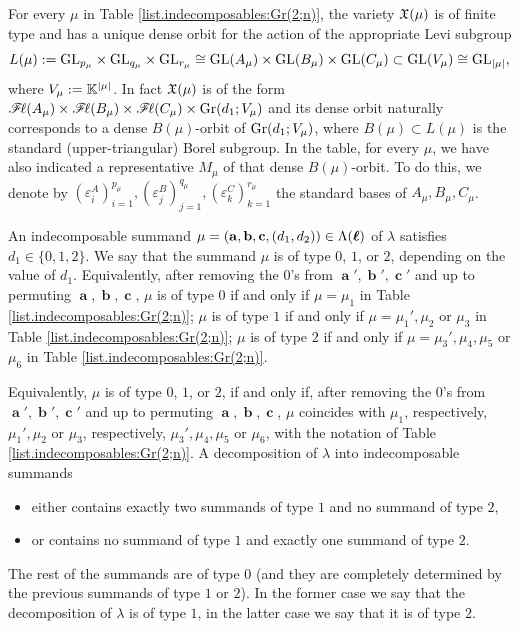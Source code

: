\documentclass[12pt,reqno]{amsart}
\begin{document}
For every $\mu$ in Table \ref{list.indecomposables:Gr(2;n)}, the variety $\mathfrak{X}(\mu)$ is of finite type and has a unique dense orbit for the action of the appropriate Levi subgroup
$$L(\mu):=\mathrm{GL}_{p_\mu}\times \mathrm{GL}_{q_\mu}\times \mathrm{GL}_{r_\mu}\cong \mathrm{GL}(A_\mu)\times\mathrm{GL}(B_\mu)\times\mathrm{GL}(C_\mu)\subset \mathrm{GL}(V_\mu)\cong\mathrm{GL}_{|\mu|},$$
where $V_\mu:=\mathbb{K}^{|\mu|}$. %
In fact $\mathfrak{X}(\mu)$ is of the form
$\mathscr{F}\!\ell(A_\mu)\times\mathscr{F}\!\ell(B_\mu)\times\mathscr{F}\!\ell(C_\mu)\times\mathrm{Gr}(d_1;V_\mu)$
and its dense orbit naturally corresponds to a dense $B(\mu)$-orbit of $\mathrm{Gr}(d_1;V_\mu)$, where $B(\mu)\subset L(\mu)$ is the standard (upper-triangular) Borel subgroup. In the table, for every $\mu$, we have also indicated a representative $M_\mu$ of that dense $B(\mu)$-orbit. To do this, we denote by $(\varepsilon_i^A)_{i=1}^{p_\mu}, (\varepsilon_j^B)_{j=1}^{q_\mu},(\varepsilon_k^C)_{k=1}^{r_\mu}$ the standard bases of $A_\mu,B_\mu,C_\mu$.

An indecomposable summand $\mu=(\mathbf{a},\mathbf{b},\mathbf{c},(d_1,d_2))\in\Lambda(\boldsymbol{\ell})$ of $\lambda$
satisfies $d_1\in\{0,1,2\}$. We say that the summand $\mu$ is of type $0$, $1$, or $2$, depending on the value of $d_1$.
Equivalently, after removing the $0$'s from $\mbfa',\mbfb',\mbfc'$ and up to permuting $\mbfa,\mbfb,\mbfc$,
$\mu$ is of type $0$ if and only if $ \mu = \mu_1 $ in Table \ref{list.indecomposables:Gr(2;n)};
$\mu$ is of type $1$ if and only if $ \mu = \mu_1',\mu_2$ or $\mu_3$ in Table \ref{list.indecomposables:Gr(2;n)};
$\mu$ is of type $2$ if and only if $ \mu = \mu_3',\mu_4,\mu_5$ or $\mu_6$ in Table \ref{list.indecomposables:Gr(2;n)}.

Equivalently, $\mu$ is of type $0$, $1$, or $2$, if and only if, after removing the $0$'s from $\mbfa',\mbfb',\mbfc'$ and up to permuting $\mbfa,\mbfb,\mbfc$, $\mu$ coincides with $\mu_1$, respectively, $\mu_1',\mu_2$ or $\mu_3$, respectively, $\mu_3',\mu_4,\mu_5$ or $\mu_6$, with the notation of Table \ref{list.indecomposables:Gr(2;n)}.
A decomposition of $\lambda$ into indecomposable summands
\begin{itemize}
    \item either contains exactly two summands of type $1$ and no summand of type $2$,
    \item or contains no summand of type $1$ and exactly one summand of type $2$.
\end{itemize}
The rest of the summands are of type $0$ (and they are completely determined by the previous summands of type $1$ or $2$). In the former case we say that the decomposition of $\lambda$ is of type $1$, in the latter case
we say that it is of type $2$.
\end{document}
